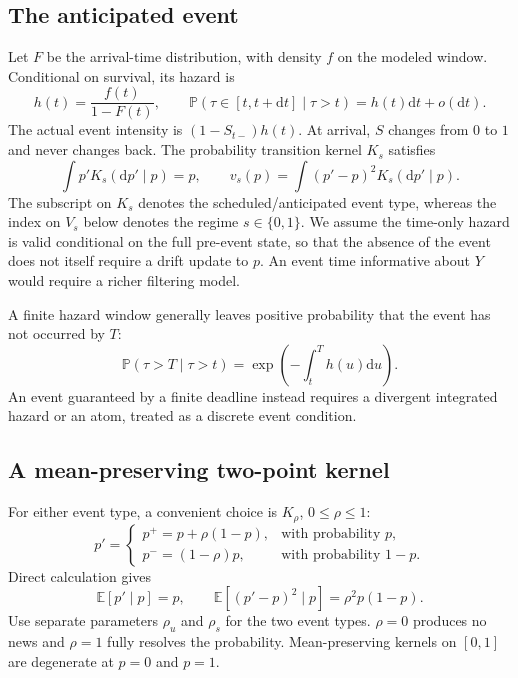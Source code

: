 \documentclass[11pt]{article}
\newcommand{\E}{\mathbb E}
\newcommand{\Prob}{\mathbb P}
\newcommand{\1}{\mathbf 1}
\newcommand{\dd}{\mathrm d}
\begin{document}
\subsection{The anticipated event}
Let $F$ be the arrival-time distribution, with density $f$ on the modeled
window. Conditional on survival, its hazard is
\begin{equation}
 h(t)=\frac{f(t)}{1-F(t)},\qquad
 \Prob(\tau\in[t,t+\dd t]\mid\tau>t)=h(t)\dd t+o(\dd t).
\end{equation}
The actual event intensity is $(1-S_{t-})h(t)$. At arrival, $S$ changes
from $0$ to $1$ and never changes back. The probability transition kernel
$K_s$ satisfies
\begin{equation}
 \int p'K_s(\dd p'\mid p)=p,
 \qquad v_s(p)=\int(p'-p)^2K_s(\dd p'\mid p).
\end{equation}
The subscript on $K_s$ denotes the scheduled/anticipated event type, whereas
the index on $V_s$ below denotes the regime $s\in\{0,1\}$.
We assume the time-only hazard is valid conditional on the full pre-event
state, so that the absence of the event does not itself require a drift update
to $p$. An event time informative about $Y$ would require a richer filtering model.

A finite hazard window generally leaves positive probability that the event
has not occurred by $T$:
\begin{equation}
 \Prob(\tau>T\mid\tau>t)=\exp\left(-\int_t^T h(u)\dd u\right).
\end{equation}
An event guaranteed by a finite deadline instead requires a divergent
integrated hazard or an atom, treated as a discrete event condition.

\subsection{A mean-preserving two-point kernel}
For either event type, a convenient choice is $K_\rho$, $0\le\rho\le1$:
\begin{equation}
 p'=\begin{cases}
 p^+=p+\rho(1-p),&\text{with probability }p,\\
 p^-=(1-\rho)p,&\text{with probability }1-p.
 \end{cases}
\end{equation}
Direct calculation gives
\begin{equation}
 \E[p'\mid p]=p,\qquad
 \E[(p'-p)^2\mid p]=\rho^2p(1-p).
\end{equation}
Use separate parameters $\rho_u$ and $\rho_s$ for the two event types.
$\rho=0$ produces no news and $\rho=1$ fully resolves the probability.
Mean-preserving kernels on $[0,1]$ are degenerate at $p=0$ and $p=1$.
\end{document}
